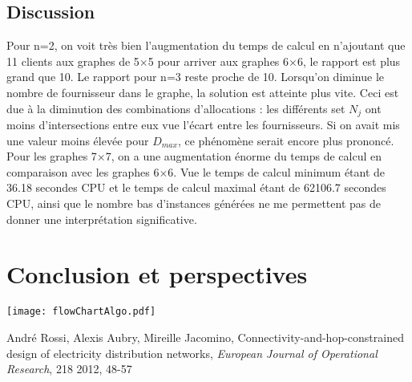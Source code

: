 \documentclass[12pt,a4paper]{article}
\newenvironment{FFigure}
  {\par\medskip\noindent\minipage{\linewidth}}
  {\endminipage\par\medskip}
\begin{document}
\begin{multicols}{2}
\subsection{Discussion}
Pour n=2, on voit très bien l'augmentation du temps de calcul en n'ajoutant que 11 clients aux graphes de 5$\times$5 pour arriver aux graphes 6$\times$6, le rapport est plus grand que 10. Le rapport pour n=3 reste proche de 10. Lorsqu'on diminue le nombre de fournisseur dans le graphe, la solution est atteinte plus vite. Ceci est due à la diminution des combinations d'allocations : les différents set $N_{j}$ ont moins d'intersections entre eux vue l'écart entre les fournisseurs. Si on avait mis une valeur moins élevée pour $D_{max}$, ce phénomène serait encore plus prononcé.\newline \indent
Pour les graphes 7$\times$7, on a une augmentation énorme du temps de calcul en comparaison avec les graphes 6$\times$6. Vue le temps de calcul minimum étant de 36.18 secondes CPU et le temps de calcul maximal étant de 62106.7 secondes CPU, ainsi que le nombre bas d'instances générées ne me permettent pas de donner une interprétation significative.
\section{Conclusion et perspectives}

\pagebreak
\begin{FFigure}
	\centering
    \texttt{[image: flowChartAlgo.pdf]}
    \label{fig:algo}
\end{FFigure}
\pagebreak


\begin{thebibliography}{20}
André Rossi, Alexis Aubry, Mireille Jacomino, Connectivity-and-hop-constrained design of electricity distribution networks,  \textit{European Journal of Operational Research}, 218 2012, 48-57
\end{thebibliography}
\end{multicols}
\end{document}
